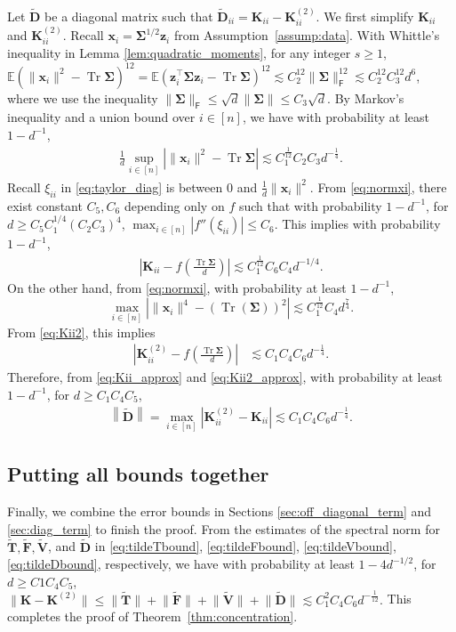 \documentclass[twoside,11pt]{article}
\newcommand{\norm}[1]{\left\|#1\right\|}
\newcommand{\E}{\mathbb{E}}
\def\bD{{\boldsymbol D}}
\def\bF{{\boldsymbol F}}
\def\bK{{\boldsymbol K}}
\def\bT{{\boldsymbol T}}
\def\bV{{\boldsymbol V}}
\def\bx{{\boldsymbol x}}
\def\bz{{\boldsymbol z}}
\def\bSigma{{\boldsymbol \Sigma}}
\newcommand{\bKquad}{\bK^{(2)}}
\renewcommand{\bK}{\boldsymbol{K}}
\newcommand{\Tr}{\operatorname{Tr}}
\newcommand{\1}{\mathbf{1}}
\def\msf{\mathsf}
\begin{document}
Let $\widetilde \bD$ be a diagonal matrix such that 
$
    \widetilde \bD_{ii}= \bK_{ii}- \bKquad_{ii}$.
We first simplify $\bK_{ii}$ and $\bK_{ii}^{(2)}$.
Recall $\bx_i=\bSigma^{1/2} \bz_i$ from Assumption~\ref{assump:data}. With Whittle’s inequality in Lemma \ref{lem:quadratic_moments}, for any integer $s\geq 1$, 
$ \mathbb E\left(\|\bx_i\|^2-\Tr \bSigma\right)^{12}= \E \left( \bz_i^\top \bSigma \bz_i -\Tr\bSigma \right)^{12} \lesssim C_2^{12} \|\bSigma\|_{\msf F}^{12} \lesssim  C_2^{12} C_3^{12} d^6$,
where we use the inequality $\|\bSigma\|_{\msf F} \leq \sqrt{d} \|\bSigma\|\leq C_3\sqrt{d}$. By Markov's inequality and a union bound over $i\in [n]$, we have with probability at least $1-d^{-1}$,  
\begin{align} \label{eq:normxi}
\frac{1}{d} \sup_{i\in [n]}\left|  \|\bx_i\|^2-\Tr\bSigma\right|\lesssim C_1^{\frac{1}{12}}C_2C_3  d^{-\frac{1}{4}}.
\end{align}
Recall $\xi_{ii}$  in \eqref{eq:taylor_diag} is  between $0$ and $\frac{1}{d} \|\bx_i\|^2$.   From \eqref{eq:normxi}, there exist constant $C_5, C_6$ depending only on $f$ such that with probability $1-d^{-1}$, for $d\geq C_5C_1^{1/4} (C_2C_3)^4$, $\max_{i\in [n]}|f''(\xi_{ii})|\leq C_6$.
This implies  with probability $1-d^{-1}$, 
\begin{align}\label{eq:Kii_approx}
\left|\bK_{ii}-f\left(\frac{\Tr\bSigma}{d}\right)\right|\lesssim C_1^{\frac{1}{12}}C_6 C_4d^{-1/4}.
\end{align}
On the other hand, from \eqref{eq:normxi}, with probability at least $1-d^{-1}$,
  $$\max_{i\in [n]}\left|\|\bx_i\|^4-(\Tr(\bSigma))^2\right|\lesssim C_1^{\frac{1}{12}}C_4 d^{\frac{7}{4}}.$$
From \eqref{eq:Kii2}, this implies
\begin{align}\label{eq:Kii2_approx}
    \left|\bK_{ii}^{(2)}-f\left(\frac{\Tr\bSigma}{d}\right)\right|&\lesssim C_1C_4C_6 d^{-\frac{1}{4}}.
\end{align}
Therefore, from \eqref{eq:Kii_approx} and \eqref{eq:Kii2_approx}, with  probability at least $1-d^{-1}$, for $d\geq C_1C_4C_5$,
\begin{align} \label{eq:tildeDbound}
\norm{\widetilde \bD} =\max_{i\in [n]}|\bK_{ii}^{(2)}-\bK_{ii}|\lesssim C_1C_4C_6d^{-\frac{1}{4}}.
\end{align}


\subsection{Putting all bounds together}\label{sec:together}
Finally, we combine the error bounds in Sections \ref{sec:off_diagonal_term} and \ref{sec:diag_term}  to finish the proof. 
From the estimates of the spectral norm for $\widetilde \bT, \widetilde \bF, \widetilde \bV$, and $\widetilde \bD$ in \eqref{eq:tildeTbound}, \eqref{eq:tildeFbound}, \eqref{eq:tildeVbound}, \eqref{eq:tildeDbound}, respectively,  we have with probability at least $1-4d^{-1/2}$, for $d\geq C1C_4C_5$,
$
    \big\|\bK-\bKquad \big\| \leq \big\|\widetilde \bT\big\| +\big\|\widetilde \bF\big\|+\big\|\widetilde \bV\big\|+\big\|\widetilde \bD\big\| \lesssim C_1^2 C_4 C_6 d^{-\frac{1}{12}}.
$
This completes the proof of Theorem~\ref{thm:concentration}.
\end{document}
